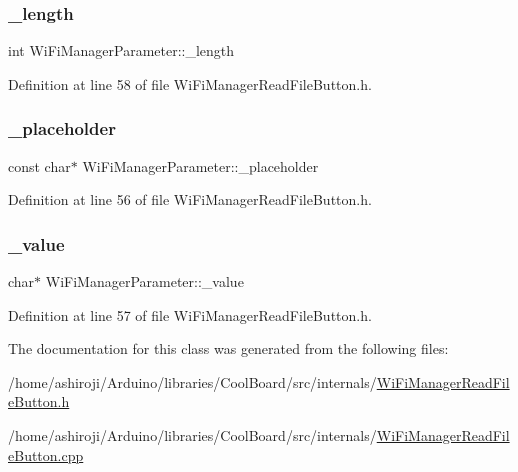 \mbox{\label{class_wi_fi_manager_parameter_a30ca2df3654651a1b5320261a061b774}} 
\subsubsection{\texorpdfstring{\+\_\+length}{\_length}}
{\footnotesize\ttfamily int Wi\+Fi\+Manager\+Parameter\+::\+\_\+length\hspace{0.3cm}{\ttfamily [private]}}



Definition at line 58 of file Wi\+Fi\+Manager\+Read\+File\+Button.\+h.

\mbox{\label{class_wi_fi_manager_parameter_aceb6003c96280319fb19f83ebaf3034b}} 
\subsubsection{\texorpdfstring{\+\_\+placeholder}{\_placeholder}}
{\footnotesize\ttfamily const char$\ast$ Wi\+Fi\+Manager\+Parameter\+::\+\_\+placeholder\hspace{0.3cm}{\ttfamily [private]}}



Definition at line 56 of file Wi\+Fi\+Manager\+Read\+File\+Button.\+h.

\mbox{\label{class_wi_fi_manager_parameter_a80c6492e74603e4df46219b23580ecb6}} 
\subsubsection{\texorpdfstring{\+\_\+value}{\_value}}
{\footnotesize\ttfamily char$\ast$ Wi\+Fi\+Manager\+Parameter\+::\+\_\+value\hspace{0.3cm}{\ttfamily [private]}}



Definition at line 57 of file Wi\+Fi\+Manager\+Read\+File\+Button.\+h.



The documentation for this class was generated from the following files\+:\begin{DoxyCompactItemize}
\item 
/home/ashiroji/\+Arduino/libraries/\+Cool\+Board/src/internals/\hyperlink{_wi_fi_manager_read_file_button_8h}{Wi\+Fi\+Manager\+Read\+File\+Button.\+h}\item 
/home/ashiroji/\+Arduino/libraries/\+Cool\+Board/src/internals/\hyperlink{_wi_fi_manager_read_file_button_8cpp}{Wi\+Fi\+Manager\+Read\+File\+Button.\+cpp}\end{DoxyCompactItemize}
